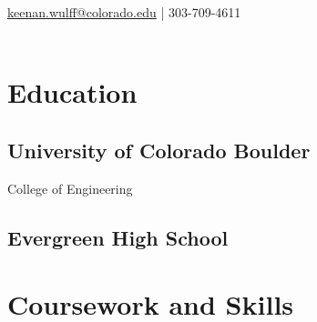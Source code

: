 \documentclass[]{deedy-resume-openfont}
\begin{document}
%
%
\lastupdated

%
%


\href{mailto:keenan.wulff@colorado.edu}{keenan.wulff@colorado.edu} | 303-709-4611 \\
\hrulefill \\
%
%

\begin{minipage}[t]{0.4\textwidth} 


\section{Education} 

\subsection{University of Colorado Boulder}
College of Engineering \\
\sectionsep

\subsection{Evergreen High School}
\sectionsep


% 
% 
\section{Coursework and Skills}

\end{minipage}
\end{document}
